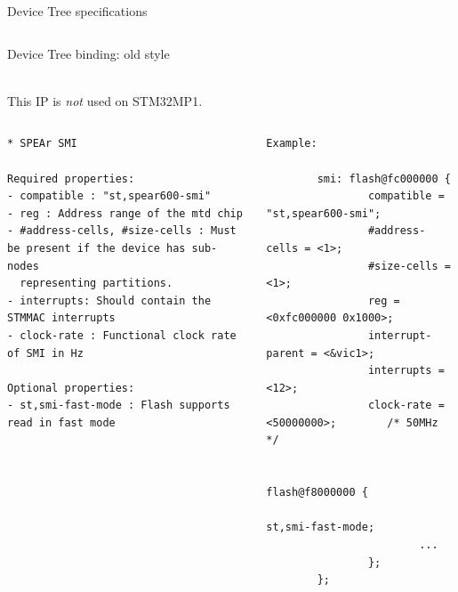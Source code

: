 \begin{frame}{Device Tree specifications}
\begin{columns}
  \end{columns}
\end{frame}

\begin{frame}[fragile]{Device Tree binding: old style}
  \begin{center}
    \\
    This IP is {\em not} used on STM32MP1.
  \end{center}
  \begin{columns}[t]
    \begin{block}{}
      {\fontsize{5}{6}\selectfont
\begin{verbatim}
* SPEAr SMI

Required properties:
- compatible : "st,spear600-smi"
- reg : Address range of the mtd chip
- #address-cells, #size-cells : Must be present if the device has sub-nodes
  representing partitions.
- interrupts: Should contain the STMMAC interrupts
- clock-rate : Functional clock rate of SMI in Hz

Optional properties:
- st,smi-fast-mode : Flash supports read in fast mode

\end{verbatim}
      }
    \end{block}
    \begin{block}{}
      {\fontsize{4}{5}\selectfont
\begin{verbatim}
Example:

        smi: flash@fc000000 {
                compatible = "st,spear600-smi";
                #address-cells = <1>;
                #size-cells = <1>;
                reg = <0xfc000000 0x1000>;
                interrupt-parent = <&vic1>;
                interrupts = <12>;
                clock-rate = <50000000>;        /* 50MHz */

                flash@f8000000 {
                        st,smi-fast-mode;
                        ...
                };
        };
\end{verbatim}
      }
    \end{block}
  \end{columns}

\end{frame}

